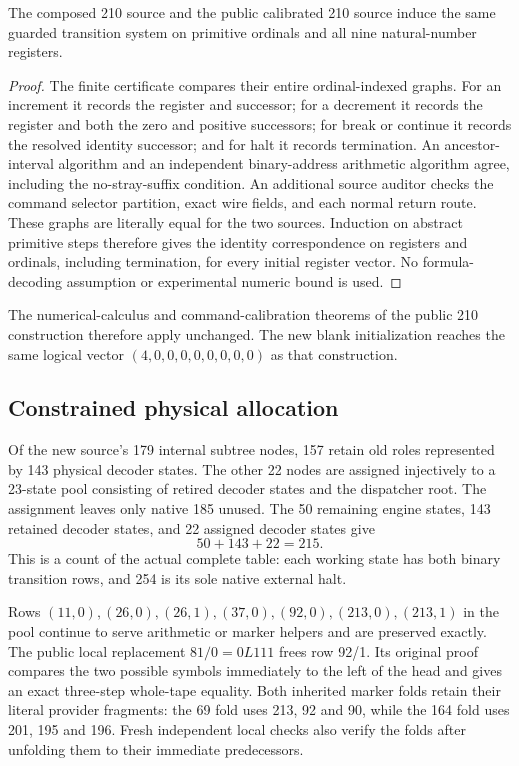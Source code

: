 \begin{lemma}
The composed 210 source and the public calibrated 210 source induce the same
guarded transition system on primitive ordinals and all nine natural-number
registers.
\end{lemma}
\begin{proof}
The finite certificate compares their entire ordinal-indexed graphs. For an
increment it records the register and successor; for a decrement it records the
register and both the zero and positive successors; for break or continue it
records the resolved identity successor; and for halt it records termination.
An ancestor-interval algorithm and an independent binary-address arithmetic
algorithm agree, including the no-stray-suffix condition. An additional source
auditor checks the command selector partition, exact wire fields, and each
normal return route. These graphs are literally equal for the two sources.
Induction on abstract primitive steps therefore gives the identity
correspondence on registers and ordinals, including termination, for every
initial register vector. No formula-decoding assumption or experimental
numeric bound is used.
\end{proof}

The numerical-calculus and command-calibration theorems of the public 210
construction therefore apply unchanged. The new blank initialization reaches
the same logical vector $(4,0,0,0,0,0,0,0,0)$ as that construction.

\subsection{Constrained physical allocation}

Of the new source's 179 internal subtree nodes, 157 retain old roles represented
by 143 physical decoder states. The other 22 nodes are assigned injectively to a
23-state pool consisting of retired decoder states and the dispatcher root.
The assignment leaves only native 185 unused. The 50 remaining engine states,
143 retained decoder states, and 22 assigned decoder states give
\[
  50+143+22=215.
\]
This is a count of the actual complete table: each working state has both
binary transition rows, and 254 is its sole native external halt.

Rows $(11,0),(26,0),(26,1),(37,0),(92,0),(213,0),(213,1)$ in the pool continue to
serve arithmetic or marker helpers and are preserved exactly. The public local
replacement $81/0=0L111$ frees row 92/1. Its original proof compares the two
possible symbols immediately to the left of the head and gives an exact
three-step whole-tape equality. Both inherited marker folds retain their
literal provider fragments: the 69 fold uses 213, 92 and 90, while the 164 fold uses
201, 195 and 196. Fresh independent local checks also verify the folds after
unfolding them to their immediate predecessors.

